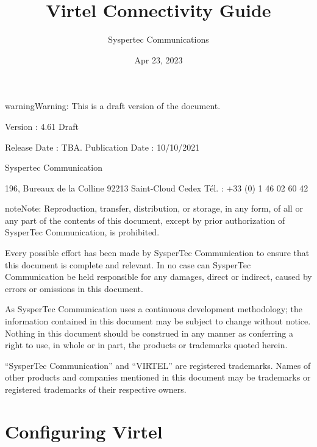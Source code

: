 \documentclass[letterpaper,10pt,english]{sphinxmanual}
\title{Virtel Connectivity Guide}
\date{Apr 23, 2023}
\author{Syspertec Communications}
\begin{document}
\pagestyle{empty}
\sphinxmaketitle
\pagestyle{plain}
\sphinxtableofcontents
\pagestyle{normal}
\label{\detokenize{connectivity_guide::doc}}




\begin{sphinxadmonition}{warning}{Warning:}
This is a draft version of the document.
\end{sphinxadmonition}

Version : 4.61 Draft

Release Date : TBA. Publication Date : 10/10/2021

Syspertec Communication

196, Bureaux de la Colline 92213 Saint-Cloud Cedex Tél. : +33 (0) 1 46 02 60 42


\begin{sphinxadmonition}{note}{Note:}
Reproduction, transfer, distribution, or storage, in any form, of all or any part of
the contents of this document, except by prior authorization of SysperTec
Communication, is prohibited.

Every possible effort has been made by SysperTec Communication to ensure that this document
is complete and relevant. In no case can SysperTec Communication be held responsible for
any damages, direct or indirect, caused by errors or omissions in this document.

As SysperTec Communication uses a continuous development methodology; the information
contained in this document may be subject to change without notice. Nothing in this
document should be construed in any manner as conferring a right to use, in whole or in
part, the products or trademarks quoted herein.

“SysperTec Communication” and “VIRTEL” are registered trademarks. Names of other products
and companies mentioned in this document may be trademarks or registered trademarks of
their respective owners.
\end{sphinxadmonition}


\chapter{Configuring Virtel}
\label{\detokenize{connectivity_guide:configuring-virtel}}\label{\detokenize{connectivity_guide:v461cn-introduction}}
\end{document}
